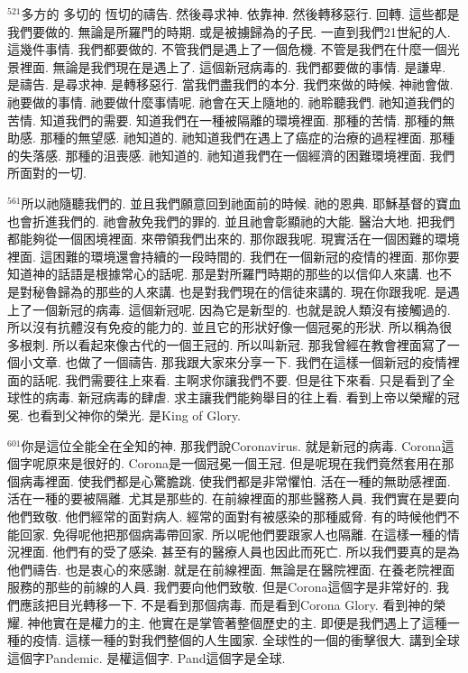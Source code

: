 \documentclass{book}
\begin{document}
$^{521}$多方的 多切的 恆切的禱告.
然後尋求神.
依靠神.
然後轉移惡行.
回轉.
這些都是我們要做的.
無論是所羅門的時期.
或是被擄歸為的子民.
一直到我們21世紀的人.
這幾件事情.
我們都要做的.
不管我們是遇上了一個危機.
不管是我們在什麼一個光景裡面.
無論是我們現在是遇上了.
這個新冠病毒的.
我們都要做的事情.
是謙卑.
是禱告.
是尋求神.
是轉移惡行.
當我們盡我們的本分.
我們來做的時候.
神祂會做.
祂要做的事情.
祂要做什麼事情呢.
祂會在天上隨地的.
祂聆聽我們.
祂知道我們的苦情.
知道我們的需要.
知道我們在一種被隔離的環境裡面.
那種的苦情.
那種的無助感.
那種的無望感.
祂知道的.
祂知道我們在遇上了癌症的治療的過程裡面.
那種的失落感.
那種的沮喪感.
祂知道的.
祂知道我們在一個經濟的困難環境裡面.
我們所面對的一切.

$^{561}$所以祂隨聽我們的.
並且我們願意回到祂面前的時候.
祂的恩典.
耶穌基督的寶血也會折進我們的.
祂會赦免我們的罪的.
並且祂會彰顯祂的大能.
醫治大地.
把我們都能夠從一個困境裡面.
來帶領我們出來的.
那你跟我呢.
現實活在一個困難的環境裡面.
這困難的環境還會持續的一段時間的.
我們在一個新冠的疫情的裡面.
那你要知道神的話語是根據常心的話呢.
那是對所羅門時期的那些的以信仰人來講.
也不是對秘魯歸為的那些的人來講.
也是對我們現在的信徒來講的.
現在你跟我呢.
是遇上了一個新冠的病毒.
這個新冠呢.
因為它是新型的.
也就是說人類沒有接觸過的.
所以沒有抗體沒有免疫的能力的.
並且它的形狀好像一個冠冕的形狀.
所以稱為很多根刺.
所以看起來像古代的一個王冠的.
所以叫新冠.
那我曾經在教會裡面寫了一個小文章.
也做了一個禱告.
那我跟大家來分享一下.
我們在這樣一個新冠的疫情裡面的話呢.
我們需要往上來看.
主啊求你讓我們不要.
但是往下來看.
只是看到了全球性的病毒.
新冠病毒的肆虐.
求主讓我們能夠舉目的往上看.
看到上帝以榮耀的冠冕.
也看到父神你的榮光.
是King of Glory.

$^{601}$你是這位全能全在全知的神.
那我們說Coronavirus.
就是新冠的病毒.
Corona這個字呢原來是很好的.
Corona是一個冠冕一個王冠.
但是呢現在我們竟然套用在那個病毒裡面.
使我們都是心驚膽跳.
使我們都是非常懼怕.
活在一種的無助感裡面.
活在一種的要被隔離.
尤其是那些的.
在前線裡面的那些醫務人員.
我們實在是要向他們致敬.
他們經常的面對病人.
經常的面對有被感染的那種威脅.
有的時候他們不能回家.
免得呢他把那個病毒帶回家.
所以呢他們要跟家人也隔離.
在這樣一種的情況裡面.
他們有的受了感染.
甚至有的醫療人員也因此而死亡.
所以我們要真的是為他們禱告.
也是衷心的來感謝.
就是在前線裡面.
無論是在醫院裡面.
在養老院裡面服務的那些的前線的人員.
我們要向他們致敬.
但是Corona這個字是非常好的.
我們應該把目光轉移一下.
不是看到那個病毒.
而是看到Corona Glory.
看到神的榮耀.
神他實在是權力的主.
他實在是掌管著整個歷史的主.
即便是我們遇上了這種一種的疫情.
這樣一種的對我們整個的人生國家.
全球性的一個的衝擊很大.
講到全球這個字Pandemic.
是權這個字.
Pand這個字是全球.
\end{document}
